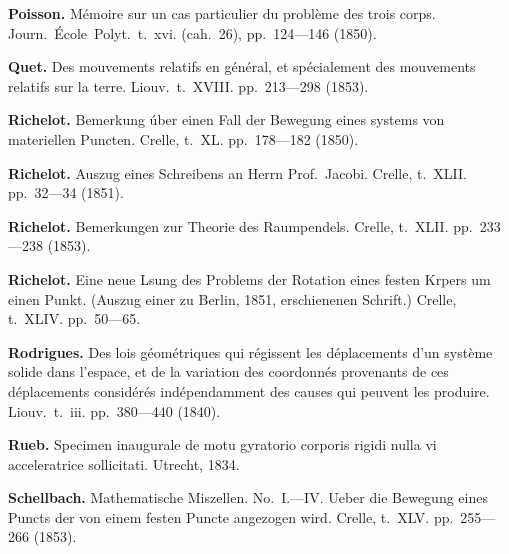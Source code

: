 \documentclass[12pt,a4paper]{article}
\theoremstyle{definition}
\begin{document}
\vspace{0.5em}

\noindent\textbf{Poisson.} M\'{e}moire sur un cas particulier du probl\`{e}me des trois corps. Journ.~\'{E}cole~Polyt.~t.~xvi. (cah.~26), pp.~124---146 (1850).

\vspace{0.5em}

\noindent\textbf{Quet.} Des mouvements relatifs en g\'{e}n\'{e}ral, et sp\'{e}cialement des mouvements relatifs sur la terre. Liouv.~t.~XVIII. pp.~213---298 (1853).

\vspace{0.5em}

\noindent\textbf{Richelot.} Bemerkung \'{u}ber einen Fall der Bewegung eines systems von materiellen Puncten. Crelle, t.~XL. pp.~178---182 (1850).

\vspace{0.5em}

\noindent\textbf{Richelot.} Auszug eines Schreibens an Herrn Prof.~Jacobi. Crelle, t.~XLII. pp.~32---34 (1851).

\vspace{0.5em}

\noindent\textbf{Richelot.} Bemerkungen zur Theorie des Raumpendels. Crelle, t.~XLII. pp.~233---238 (1853).

\vspace{0.5em}

\noindent\textbf{Richelot.} Eine neue Lsung des Problems der Rotation eines festen Krpers um einen Punkt. (Auszug einer zu Berlin, 1851, erschienenen Schrift.) Crelle, t.~XLIV. pp.~50---65.

\vspace{0.5em}

\noindent\textbf{Rodrigues.} Des lois g\'{e}om\'{e}triques qui r\'{e}gissent les d\'{e}placements d'un syst\`{e}me solide dans l'espace, et de la variation des coordonn\'{e}s provenants de ces d\'{e}placements consid\'{e}r\'{e}s ind\'{e}pendamment des causes qui peuvent les produire. Liouv.~t.~iii. pp.~380---440 (1840).

\vspace{0.5em}

\noindent\textbf{Rueb.} Specimen inaugurale de motu gyratorio corporis rigidi nulla vi acceleratrice sollicitati. Utrecht, 1834.

\vspace{0.5em}

\noindent\textbf{Schellbach.} Mathematische Miszellen. No.~I.---IV. Ueber die Bewegung eines Puncts der von einem festen Puncte angezogen wird. Crelle, t.~XLV. pp.~255---266 (1853).
\end{document}
